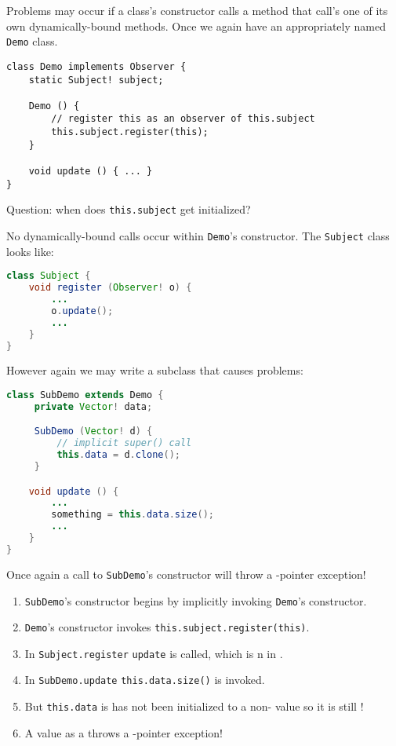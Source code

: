 \documentclass{article}
\begin{document}
\begin{example}
  Problems may occur if a class's constructor calls a method that call's one of its own dynamically-bound methods.
  Once we again have an appropriately named \texttt{Demo} class.
\begin{lstlisting}
class Demo implements Observer {
    static Subject! subject;

    Demo () {
        // register this as an observer of this.subject
        this.subject.register(this);
    }

    void update () { ... }
}
\end{lstlisting}
  Question: when does \texttt{this.subject} get initialized?

  No dynamically-bound calls occur within \texttt{Demo}'s constructor.
  The \texttt{Subject} class looks like:
\begin{lstlisting}[escapechar=|, language=Java]
class Subject {
    void register (Observer! o) {
        ...
        o.update();
        ...
    }
}
\end{lstlisting}
  However again we may write a subclass that causes problems:
\begin{lstlisting}[escapechar=|, language=Java]
class SubDemo extends Demo {
     private Vector! data;

     SubDemo (Vector! d) {
         // implicit super() call
         this.data = d.clone();
     }

    void update () {
        ...
        something = this.data.size();
        ...
    }
}
\end{lstlisting}
  Once again a call to \texttt{SubDemo}'s constructor will throw a \cringe{}-pointer exception!
  \begin{enumerate}
  \item \texttt{SubDemo}'s constructor begins by implicitly invoking \texttt{Demo}'s constructor.
  \item \texttt{Demo}'s constructor invokes \texttt{this.subject.register(this)}.
  \item In \texttt{Subject.register} \texttt{update} is called, which is \override{}n in .
  \item In \texttt{SubDemo.update} \texttt{this.data.size()} is invoked.
  \item But \texttt{this.data} is has not been initialized to a non-\cringe{} value so it is still \cringe{}!
  \item A \cringe{} value as a \receiver{} throws a \cringe{}-pointer exception!
  \end{enumerate}
\end{example}
\end{document}
